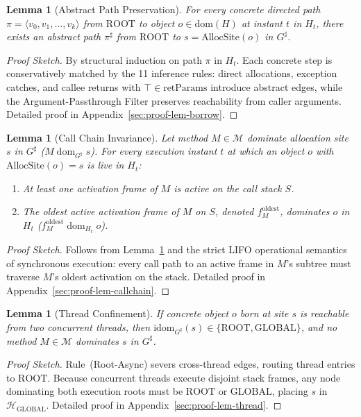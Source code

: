 \documentclass[12pt,a4paper]{article}
\newtheorem{lemma}[theorem]{Lemma}
\newcommand{\GLOBAL}{\text{GLOBAL}}
\newcommand{\ROOT}{\text{ROOT}}
\newcommand{\retParams}{\text{retParams}}
\newcommand{\idom}{\text{idom}}
\newcommand{\dom}{\mathrel{\text{dom}}}
\begin{document}
\begin{lemma}[Abstract Path Preservation]
\label{lem:borrow}
\label{lem:path-preservation}
For every concrete directed path $\pi = \langle v_0, v_1, \ldots, v_k \rangle$ from $\ROOT$ to object $o \in \text{dom}(H)$ at instant $t$ in $H_t$, there exists an abstract path $\pi^\sharp$ from $\ROOT$ to $s = \text{AllocSite}(o)$ in $G^\sharp$.
\end{lemma}
\begin{proof}[Proof Sketch]
By structural induction on path $\pi$ in $H_t$. Each concrete step is conservatively matched by the 11 inference rules: direct allocations, exception catches, and callee returns with $\top \in \retParams$ introduce abstract edges, while the Argument-Passthrough Filter preserves reachability from caller arguments. Detailed proof in Appendix~\ref{sec:proof-lem-borrow}.
\end{proof}

\begin{lemma}[Call Chain Invariance]
\label{lem:callchain}
Let method $M \in \mathcal{M}$ dominate allocation site $s$ in $G^\sharp$ ($M \dom_{G^\sharp} s$). For every execution instant $t$ at which an object $o$ with $\text{AllocSite}(o) = s$ is live in $H_t$:
\begin{enumerate}
  \item At least one activation frame of $M$ is active on the call stack $S$.
  \item The oldest active activation frame of $M$ on $S$, denoted $f_M^{\text{oldest}}$, dominates $o$ in $H_t$ ($f_M^{\text{oldest}} \dom_{H_t} o$).
\end{enumerate}
\end{lemma}
\begin{proof}[Proof Sketch]
Follows from Lemma~\ref{lem:borrow} and the strict LIFO operational semantics of synchronous execution: every call path to an active frame in $M$'s subtree must traverse $M$'s oldest activation on the stack. Detailed proof in Appendix~\ref{sec:proof-lem-callchain}.
\end{proof}

\begin{lemma}[Thread Confinement]
\label{lem:thread}
If concrete object $o$ born at site $s$ is reachable from two concurrent threads, then $\idom_{G^\sharp}(s) \in \{\ROOT, \GLOBAL\}$, and no method $M \in \mathcal{M}$ dominates $s$ in $G^\sharp$.
\end{lemma}
\begin{proof}[Proof Sketch]
Rule~(Root-Async) severs cross-thread edges, routing thread entries to $\ROOT$. Because concurrent threads execute disjoint stack frames, any node dominating both execution roots must be $\ROOT$ or $\GLOBAL$, placing $s$ in $\mathcal{H}_{\GLOBAL}$. Detailed proof in Appendix~\ref{sec:proof-lem-thread}.
\end{proof}
\end{document}
